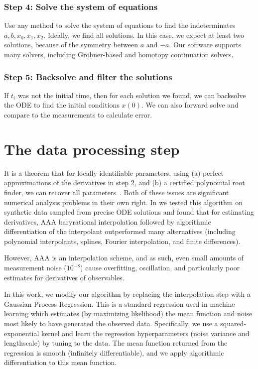 \documentclass{ifacconf}
\begin{document}
	\subsubsection{Step 4: Solve the system of equations}
	Use any method to solve the system of equations to find the indeterminates $a, b, x_0, x_1, x_2$. Ideally, we find all solutions.  In this case, we expect at least two solutions, because of the symmetry between $a$ and $-a$.  Our software supports many solvers, including Gr\"obner-based and homotopy continuation solvers.  %
	
	\subsubsection{Step 5: Backsolve and filter the solutions}  %
	If $t_i$ was not the initial time, then for each solution we found, we can backsolve the ODE to find the initial conditions $x(0)$.  We can also forward solve and compare to the measurements to calculate error.  %
	
	\section{The data processing step}\label{sec:data}
	It is a theorem that for locally identifiable parameters, using (a) perfect approximations of the derivatives in step 2, and (b) a certified polynomial root finder, we can recover all parameters~\citep{hong:20}.  Both of these issues are significant numerical analysis problems in their own right.  In \citep{bassik2023robustparameterestimationrational} we tested this algorithm on synthetic data sampled from precise ODE solutions and found that for estimating derivatives, AAA baryrational interpolation followed by algorithmic differentiation of the interpolant outperformed many alternatives (including polynomial interpolants, splines, Fourier interpolation, and finite differences).
	
	However, AAA is an interpolation scheme, and as such, even small amounts of measurement noise ($10^{-8}$) cause overfitting, oscillation, and particularly poor estimates for derivatives of observables.
	
	In this work, we modify our algorithm by %
    replacing the interpolation step with a Gaussian Process Regression.  This is a standard regression used in machine learning which estimates (by maximizing likelihood) the mean function and noise most likely to have generated the observed data.  Specifically, we use a squared-exponential kernel and learn the regression hyperparameters (noise variance and lengthscale) by tuning to the data.  The mean function returned from the regression is smooth (infinitely differentiable), and we apply algorithmic differentiation to this mean function.  %
\end{document}
